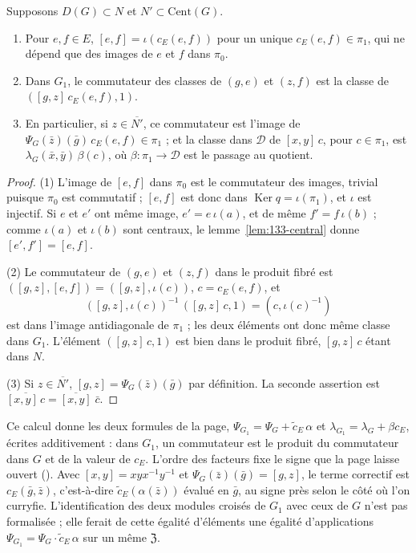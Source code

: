 \begin{enonce}
Supposons $D(G) \subset N$ et $N' \subset \mathrm{Cent}(G)$.
\begin{enumerate}
\item Pour $e, f \in E$, $[e, f] = \iota(c_E(e, f))$ pour un unique $c_E(e, f) \in \pi_1$, qui ne dépend que des images de $e$ et $f$ dans $\pi_0$.
\item Dans $G_1$, le commutateur des classes de $(g, e)$ et $(z, f)$ est la classe de $([g, z]\,c_E(e, f), 1)$.
\item En particulier, si $z \in \overline{N'}$, ce commutateur est l'image de $\Psi_G(\bar z)(\bar g)\,c_E(e, f) \in \pi_1$ ; et la classe dans $\mathcal D$ de $[x, y]\,c$, pour $c \in \pi_1$, est $\lambda_G(\bar x, \bar y)\,\beta(c)$, où $\beta : \pi_1 \to \mathcal D$ est le passage au quotient.
\end{enumerate}
\end{enonce}

\begin{proof}
(1) L'image de $[e, f]$ dans $\pi_0$ est le commutateur des images, trivial puisque $\pi_0$ est commutatif ; $[e, f]$ est donc dans $\operatorname{Ker} q = \iota(\pi_1)$, et $\iota$ est injectif. Si $e$ et $e'$ ont même image, $e' = e\,\iota(a)$, et de même $f' = f\,\iota(b)$ ; comme $\iota(a)$ et $\iota(b)$ sont centraux, le lemme~\ref{lem:133-central} donne $[e', f'] = [e, f]$.

(2) Le commutateur de $(g, e)$ et $(z, f)$ dans le produit fibré est $([g, z], [e, f]) = ([g, z], \iota(c))$, $c = c_E(e, f)$, et
\[
([g, z], \iota(c))^{-1}\,([g, z]\,c, 1) = (c, \iota(c)^{-1})
\]
est dans l'image antidiagonale de $\pi_1$ ; les deux éléments ont donc même classe dans $G_1$. L'élément $([g, z]\,c, 1)$ est bien dans le produit fibré, $[g, z]\,c$ étant dans $N$.

(3) Si $z \in \overline{N'}$, $[g, z] = \Psi_G(\bar z)(\bar g)$ par définition. La seconde assertion est $\overline{[x, y]\,c} = \overline{[x, y]}\;\bar c$.
\end{proof}

\begin{remarque}
Ce calcul donne les deux formules de la page, $\Psi_{G_1} = \Psi_G + \tilde c_E\,\alpha$ et $\lambda_{G_1} = \lambda_G + \beta c_E$, écrites additivement : dans $G_1$, un commutateur est le produit du commutateur dans $G$ et de la valeur de $c_E$. L'ordre des facteurs fixe le signe que la page laisse ouvert (). Avec $[x, y] = xyx^{-1}y^{-1}$ et $\Psi_G(\bar z)(\bar g) = [g, z]$, le terme correctif est $c_E(\bar g, \bar z)$, c'est-à-dire $\tilde c_E(\alpha(\bar z))$ évalué en $\bar g$, au signe près selon le côté où l'on curryfie. L'identification des deux modules croisés de $G_1$ avec ceux de $G$ n'est pas formalisée ; elle ferait de cette égalité d'éléments une égalité d'applications $\Psi_{G_1} = \Psi_G \cdot \tilde c_E\,\alpha$ sur un même $\mathfrak Z$.
\end{remarque}

